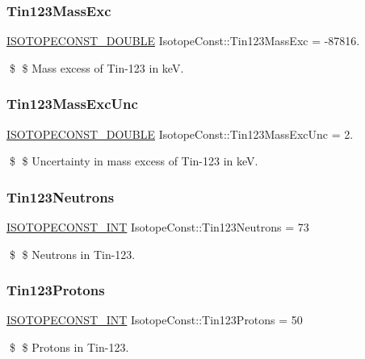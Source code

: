 \subsubsection{\texorpdfstring{Tin123\+Mass\+Exc}{Tin123MassExc}}
{\footnotesize\ttfamily \mbox{\hyperlink{group___isotope_const-_macros_ga8f45a7272ce02c0b4c65c44636ed719a}{I\+S\+O\+T\+O\+P\+E\+C\+O\+N\+S\+T\+\_\+\+D\+O\+U\+B\+LE}} Isotope\+Const\+::\+Tin123\+Mass\+Exc = -\/87816.}

\$ \$ Mass excess of Tin-\/123 in keV. \mbox{\label{group___isotope_const-_tin-_sn123_ga23715817b7db268137b85fb339b3e089}} 
\subsubsection{\texorpdfstring{Tin123\+Mass\+Exc\+Unc}{Tin123MassExcUnc}}
{\footnotesize\ttfamily \mbox{\hyperlink{group___isotope_const-_macros_ga8f45a7272ce02c0b4c65c44636ed719a}{I\+S\+O\+T\+O\+P\+E\+C\+O\+N\+S\+T\+\_\+\+D\+O\+U\+B\+LE}} Isotope\+Const\+::\+Tin123\+Mass\+Exc\+Unc = 2.}

\$ \$ Uncertainty in mass excess of Tin-\/123 in keV. \mbox{\label{group___isotope_const-_tin-_sn123_ga6187d4128a5ffd681e42a90c3fff8caf}} 
\subsubsection{\texorpdfstring{Tin123\+Neutrons}{Tin123Neutrons}}
{\footnotesize\ttfamily \mbox{\hyperlink{group___isotope_const-_macros_ga5f18360b3e99483a35c32d789e62621c}{I\+S\+O\+T\+O\+P\+E\+C\+O\+N\+S\+T\+\_\+\+I\+NT}} Isotope\+Const\+::\+Tin123\+Neutrons = 73}

\$ \$ Neutrons in Tin-\/123. \mbox{\label{group___isotope_const-_tin-_sn123_ga378ce3b2e647c34d3b91c2a8dbd91c82}} 
\subsubsection{\texorpdfstring{Tin123\+Protons}{Tin123Protons}}
{\footnotesize\ttfamily \mbox{\hyperlink{group___isotope_const-_macros_ga5f18360b3e99483a35c32d789e62621c}{I\+S\+O\+T\+O\+P\+E\+C\+O\+N\+S\+T\+\_\+\+I\+NT}} Isotope\+Const\+::\+Tin123\+Protons = 50}

\$ \$ Protons in Tin-\/123. 